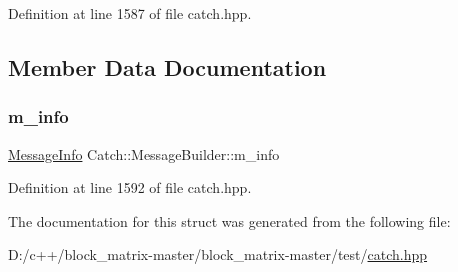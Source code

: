 Definition at line 1587 of file catch.\+hpp.



\subsection{Member Data Documentation}
\mbox{\label{struct_catch_1_1_message_builder_a979f1c2b36d78f80ee275bfa5ba0209f}} 
\subsubsection{\texorpdfstring{m\+\_\+info}{m\_info}}
{\footnotesize\ttfamily \mbox{\hyperlink{struct_catch_1_1_message_info}{Message\+Info}} Catch\+::\+Message\+Builder\+::m\+\_\+info}



Definition at line 1592 of file catch.\+hpp.



The documentation for this struct was generated from the following file\+:\begin{DoxyCompactItemize}
\item 
D\+:/c++/block\+\_\+matrix-\/master/block\+\_\+matrix-\/master/test/\mbox{\hyperlink{catch_8hpp}{catch.\+hpp}}\end{DoxyCompactItemize}
